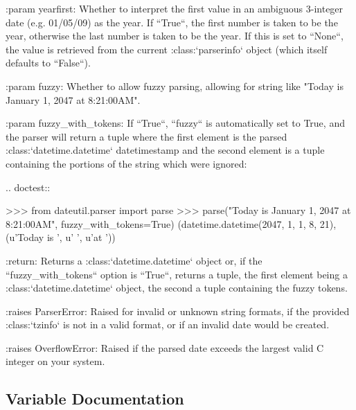 \begin{DoxyVerb}
:param yearfirst:
    Whether to interpret the first value in an ambiguous 3-integer date
    (e.g. 01/05/09) as the year. If ``True``, the first number is taken to
    be the year, otherwise the last number is taken to be the year. If
    this is set to ``None``, the value is retrieved from the current
    :class:`parserinfo` object (which itself defaults to ``False``).

:param fuzzy:
    Whether to allow fuzzy parsing, allowing for string like "Today is
    January 1, 2047 at 8:21:00AM".

:param fuzzy_with_tokens:
    If ``True``, ``fuzzy`` is automatically set to True, and the parser
    will return a tuple where the first element is the parsed
    :class:`datetime.datetime` datetimestamp and the second element is
    a tuple containing the portions of the string which were ignored:

    .. doctest::

        >>> from dateutil.parser import parse
        >>> parse("Today is January 1, 2047 at 8:21:00AM", fuzzy_with_tokens=True)
        (datetime.datetime(2047, 1, 1, 8, 21), (u'Today is ', u' ', u'at '))

:return:
    Returns a :class:`datetime.datetime` object or, if the
    ``fuzzy_with_tokens`` option is ``True``, returns a tuple, the
    first element being a :class:`datetime.datetime` object, the second
    a tuple containing the fuzzy tokens.

:raises ParserError:
    Raised for invalid or unknown string formats, if the provided
    :class:`tzinfo` is not in a valid format, or if an invalid date would
    be created.

:raises OverflowError:
    Raised if the parsed date exceeds the largest valid C integer on
    your system.
\end{DoxyVerb}
 

\subsection{Variable Documentation}
\mbox{\label{namespacedateutil_1_1parser_1_1__parser_a8e75ff5e3f1593dc66f300731a663464}} 
